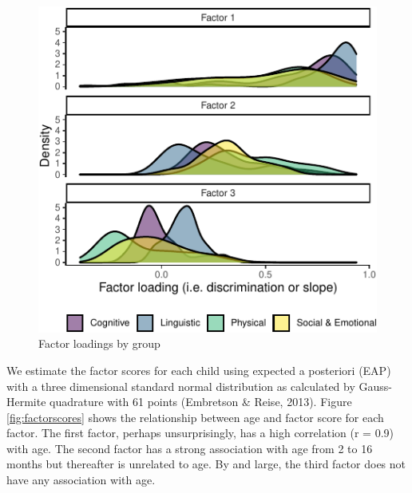 \documentclass[10pt, letterpaper]{article}
\newenvironment{CodeChunk}{}{}
\begin{document}
\begin{CodeChunk}
\begin{figure}[tb]
\includegraphics{figs/factorloadings-1} \caption[Factor loadings by group]{Factor loadings by group}\label{fig:factorloadings}
\end{figure}
\end{CodeChunk}

We estimate the factor scores for each child using expected a posteriori
(EAP) with a three dimensional standard normal distribution as
calculated by Gauss-Hermite quadrature with 61 points (Embretson \&
Reise, 2013). Figure \ref{fig:factorscores} shows the relationship
between age and factor score for each factor. The first factor, perhaps
unsurprisingly, has a high correlation (r = 0.9) with age. The second
factor has a strong association with age from 2 to 16 months but
thereafter is unrelated to age. By and large, the third factor does not
have any association with age.
\end{document}
